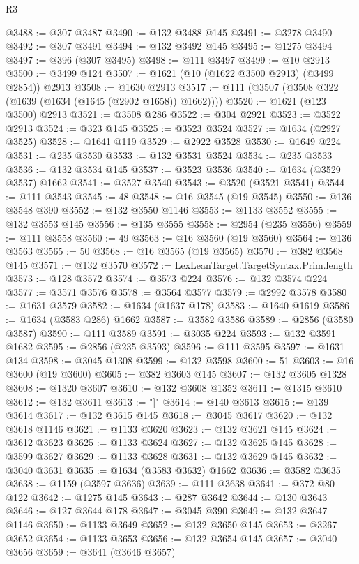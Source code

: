 \begin{lexlean}{R3}
\begin{coremodule}
@3488 := @307 @3487
@3490 := @132 @3488 @145
@3491 := @3278 @3490
@3492 := @307 @3491
@3494 := @132 @3492 @145
@3495 := @1275 @3494
@3497 := @396 (@307 @3495)
@3498 := @111 @3497
@3499 := @10 @2913
@3500 := @3499 @124
@3507 := @1621 (@10 (@1622 @3500 @2913) (@3499 @2854)) @2913
@3508 := @1630 @2913
@3517 := @111 (@3507 (@3508 @322 (@1639 (@1634 (@1645 (@2902 @1658)) @1662))))
@3520 := @1621 (@123 @3500) @2913
@3521 := @3508 @286
@3522 := @304 @2921
@3523 := @3522 @2913
@3524 := @323 @145
@3525 := @3523 @3524
@3527 := @1634 (@2927 @3525)
@3528 := @1641 @119
@3529 := @2922 @3528
@3530 := @1649 @224
@3531 := @235 @3530
@3533 := @132 @3531 @3524
@3534 := @235 @3533
@3536 := @132 @3534 @145
@3537 := @3523 @3536
@3540 := @1634 (@3529 @3537) @1662
@3541 := @3527 @3540
@3543 := @3520 (@3521 @3541)
@3544 := @111 @3543
@3545 := 48
@3548 := @16 @3545 (@19 @3545)
@3550 := @136 @3548 @390
@3552 := @132 @3550 @1146
@3553 := @1133 @3552
@3555 := @132 @3553 @145
@3556 := @135 @3555
@3558 := @2954 (@235 @3556)
@3559 := @111 @3558
@3560 := 49
@3563 := @16 @3560 (@19 @3560)
@3564 := @136 @3563
@3565 := 50
@3568 := @16 @3565 (@19 @3565)
@3570 := @382 @3568 @145
@3571 := @132 @3570
@3572 := LexLeanTarget.TargetSyntax.Prim.length
@3573 := @128 @3572
@3574 := @3573 @224
@3576 := @132 @3574 @224
@3577 := @3571 @3576
@3578 := @3564 @3577
@3579 := @2992 @3578
@3580 := @1631 @3579
@3582 := @1634 (@1637 @178)
@3583 := @1640 @1619
@3586 := @1634 (@3583 @286) @1662
@3587 := @3582 @3586
@3589 := @2856 (@3580 @3587)
@3590 := @111 @3589
@3591 := @3035 @224
@3593 := @132 @3591 @1682
@3595 := @2856 (@235 @3593)
@3596 := @111 @3595
@3597 := @1631 @134
@3598 := @3045 @1308
@3599 := @132 @3598
@3600 := 51
@3603 := @16 @3600 (@19 @3600)
@3605 := @382 @3603 @145
@3607 := @132 @3605 @1328
@3608 := @1320 @3607
@3610 := @132 @3608 @1352
@3611 := @1315 @3610
@3612 := @132 @3611
@3613 := "]"
@3614 := @140 @3613
@3615 := @139 @3614
@3617 := @132 @3615 @145
@3618 := @3045 @3617
@3620 := @132 @3618 @1146
@3621 := @1133 @3620
@3623 := @132 @3621 @145
@3624 := @3612 @3623
@3625 := @1133 @3624
@3627 := @132 @3625 @145
@3628 := @3599 @3627
@3629 := @1133 @3628
@3631 := @132 @3629 @145
@3632 := @3040 @3631
@3635 := @1634 (@3583 @3632) @1662
@3636 := @3582 @3635
@3638 := @1159 (@3597 @3636)
@3639 := @111 @3638
@3641 := @372 @80 @122
@3642 := @1275 @145
@3643 := @287 @3642
@3644 := @130 @3643
@3646 := @127 @3644 @178
@3647 := @3045 @390
@3649 := @132 @3647 @1146
@3650 := @1133 @3649
@3652 := @132 @3650 @145
@3653 := @3267 @3652
@3654 := @1133 @3653
@3656 := @132 @3654 @145
@3657 := @3040 @3656
@3659 := @3641 (@3646 @3657)

\end{coremodule}
\end{lexlean}

